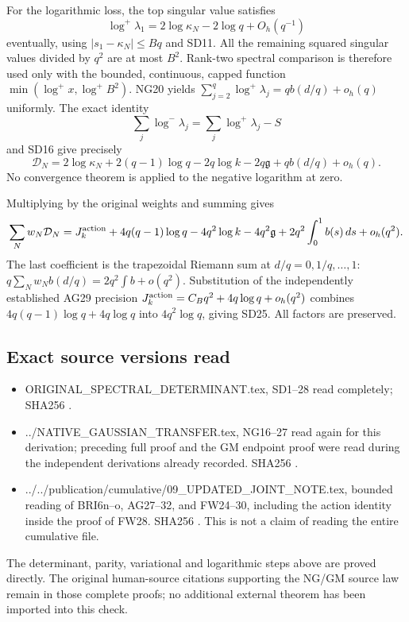 \documentclass{article}
\providecommand{\tightlist}{\setlength{\itemsep}{0pt}\setlength{\parskip}{0pt}}
\begin{document}
For the logarithmic loss, the top singular value satisfies \[
\log^+\lambda_1=2\log\kappa_N-2\log q+O_h(q^{-1})
\] eventually, using \(|s_1-\kappa_N|\le Bq\) and SD11. All the remaining squared singular values divided by \(q^2\) are at most \(B^2\). Rank-two spectral comparison is therefore used only with the bounded, continuous, capped function \(\min(\log^+x,\log^+B^2)\). NG20 yields \(\sum_{j=2}^q\log^+\lambda_j=qb(d/q)+o_h(q)\) uniformly. The exact identity \[
\sum_j\log^-\lambda_j=\sum_j\log^+\lambda_j-S
\] and SD16 give precisely \[
\mathcal D_N=2\log\kappa_N+2(q-1)\log q
-2q\log k-2q\mathfrak g+qb(d/q)+o_h(q).
\] No convergence theorem is applied to the negative logarithm at zero.

Multiplying by the original weights and summing gives \[
\sum_Nw_N\mathcal D_N=J_k^{\rm action}
+4q(q-1)\log q-4q^2\log k-4q^2\mathfrak g
+2q^2\int_0^1b(s)\,ds+o_h(q^2).
\] The last coefficient is the trapezoidal Riemann sum at \(d/q=0,1/q,\ldots,1\): \(q\sum_Nw_Nb(d/q)=2q^2\int b+o(q^2)\). Substitution of the independently established AG29 precision \(J_k^{\rm action}=C_Bq^2+4q\log q+o_h(q^2)\) combines \(4q(q-1)\log q+4q\log q\) into \(4q^2\log q\), giving SD25. All factors are preserved.

\subsection{Exact source versions read}\label{exact-source-versions-read}

\begin{itemize}
\tightlist
\item
  ORIGINAL\_SPECTRAL\_DETERMINANT.tex, SD1--28 read completely; SHA256 .
\item
  ../NATIVE\_GAUSSIAN\_TRANSFER.tex, NG16--27 read again for this derivation; preceding full proof and the GM endpoint proof were read during the independent derivations already recorded. SHA256 .
\item
  ../../publication/cumulative/09\_UPDATED\_JOINT\_NOTE.tex, bounded reading of BRI6n--o, AG27--32, and FW24--30, including the action identity inside the proof of FW28. SHA256 . This is not a claim of reading the entire cumulative file.
\end{itemize}

The determinant, parity, variational and logarithmic steps above are proved directly. The original human-source citations supporting the NG/GM source law remain in those complete proofs; no additional external theorem has been imported into this check.
\end{document}
